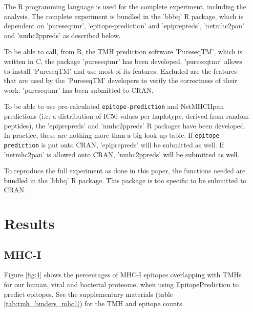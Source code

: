 The R programming language is used for the complete 
experiment, including the analysis.
The complete experiment is bundled in the 'bbbq' R package,
which is dependent on 'pureseqtmr', 
'epitope-prediction' and 'epiprepreds',
'netmhc2pan' and 'nmhc2ppreds'
as described below.

To be able to call, from R, the TMH prediction software 'PureseqTM',
which is written in C, the package 'pureseqtmr' has been developed. 
'pureseqtmr' allows to install 'PureseqTM' and use most of its features.
Excluded are the features that are used by the 'PureseqTM' 
developers to verify the correctness of their work.
'pureseqtmr' has been submitted to CRAN.

To be able to use pre-calculated 
\verb;epitope-prediction; and NetMHCIIpan
predictions (i.e. a distribution of IC50 values per haplotype, 
derived from random peptides), the 'epiprepreds' and 'nmhc2ppreds' 
R packages have been 
developed. In practice, these are nothing more than a big look-up table.
If \verb;epitope-prediction; is put onto CRAN, 'epiprepreds'
will be submitted as well.
If 'netmhc2pan' is allowed onto CRAN, 'nmhc2ppreds'
will be submitted as well.

To reproduce the full experiment as done in this paper,
the functions needed are bundled in the 'bbbq' R package.
This package is too specific to be submitted to CRAN.

\section{Results}

\subsection{MHC-I}

Figure \ref{fig:1} shows the percentages of MHC-I epitopes overlapping 
with TMHs for our human, viral and bacterial proteome,
when using EpitopePrediction to predict epitopes.
See the supplementary materials (table \ref{tab:tmh_binders_mhc1}) 
for the TMH and epitope counts.


